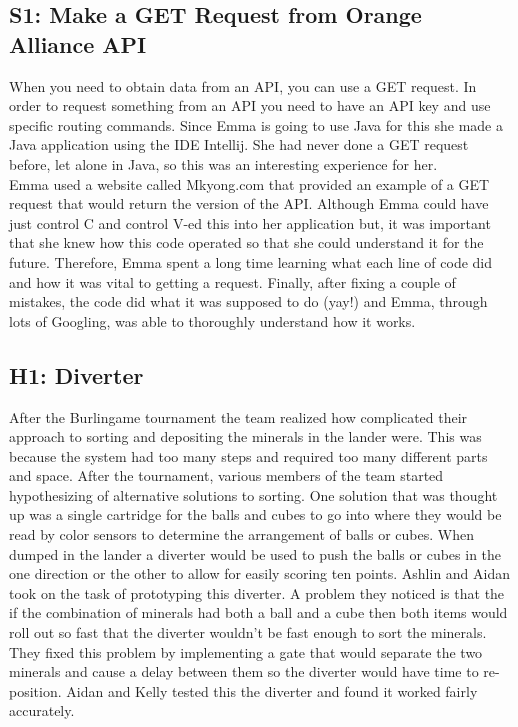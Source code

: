 \documentclass{article}
\begin{document}
\subsection{S1: Make a GET Request from Orange Alliance API}

When you need to obtain data from an API, you can use a GET request. In order to request something from an API you need to have an API key and use specific routing commands. Since Emma is going to use Java for this she made a Java application using the IDE Intellij. She had never done a GET request before, let alone in Java, so this was an interesting experience for her. \\

Emma used a website called Mkyong.com that provided an example of a GET request that would return the version of the API. Although Emma could have just control C and control V-ed this into her application but, it was important that she knew how this code operated so that she could understand it for the future. Therefore, Emma spent a long time learning what each line of code did and how it was vital to getting a request. Finally, after fixing a couple of mistakes, the code did what it was supposed to do (yay!) and Emma, through lots of Googling, was able to thoroughly understand how it works. \\
\subsection{H1: Diverter}

After the Burlingame tournament the team realized how complicated their approach to sorting and depositing the minerals in the lander were. This was because the system had too many steps and required too many different parts and space. After the tournament, various members of the team started hypothesizing of alternative solutions to sorting. One solution that was thought up was a single cartridge for the balls and cubes to go into where they would be read by color sensors to determine the arrangement of balls or cubes. When dumped in the lander a diverter would be used to push the balls or cubes in the one direction or the other to allow for easily scoring ten points. Ashlin and Aidan took on the task of prototyping this diverter. A problem they noticed is that the if the combination of minerals had both a ball and a cube then both items would roll out so fast that the diverter wouldn't be fast enough to sort the minerals. They fixed this problem by implementing a gate that would separate the two minerals and cause a delay between them so the diverter would have time to re-position. Aidan and Kelly tested this the diverter and found it worked fairly accurately.
\end{document}
